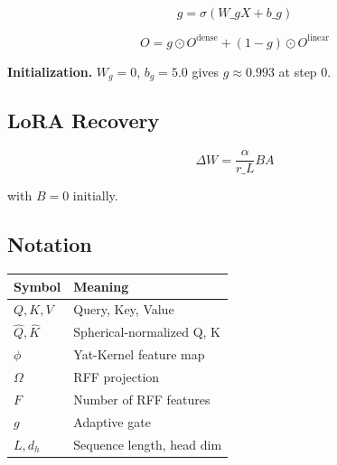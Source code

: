 \[
g = \sigma(W\_g X + b\_g)
\]

\[
O = g \odot O^\text{dense} + (1 - g) \odot O^\text{linear}
\]

\textbf{Initialization.} $W_g = 0$, $b_g = 5.0$ gives $g \approx 
0.993$ at step 0.

\subsection{LoRA Recovery}

\[
\Delta W = \frac{\alpha}{r\_L} B A
\]

with $B = 0$ initially.

\subsection{Notation}

\begin{table}[H]
\centering
\small
\begin{tabular}{ll}
\toprule
\textbf{Symbol} & \textbf{Meaning} \\
\midrule
$Q, K, V$ & Query, Key, Value \\
$\hat{Q}, \hat{K}$ & Spherical-normalized Q, K \\
$\phi$ & Yat-Kernel feature map \\
$\Omega$ & RFF projection \\
$F$ & Number of RFF features \\
$g$ & Adaptive gate \\
$L, d_h$ & Sequence length, head dim \\
\bottomrule
\end{tabular}
\end{table}

